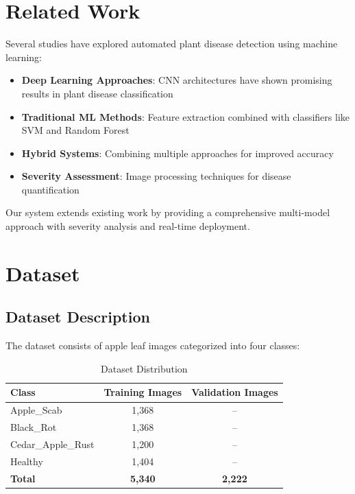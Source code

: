 \documentclass[11pt,a4paper]{article}
\begin{document}
\section{Related Work}
Several studies have explored automated plant disease detection using machine learning:
\begin{itemize}
    \item \textbf{Deep Learning Approaches}: CNN architectures have shown promising results in plant disease classification
    \item \textbf{Traditional ML Methods}: Feature extraction combined with classifiers like SVM and Random Forest
    \item \textbf{Hybrid Systems}: Combining multiple approaches for improved accuracy
    \item \textbf{Severity Assessment}: Image processing techniques for disease quantification
\end{itemize}

Our system extends existing work by providing a comprehensive multi-model approach with severity analysis and real-time deployment.

\section{Dataset}
\subsection{Dataset Description}
The dataset consists of apple leaf images categorized into four classes:
\begin{table}[h]
\centering
\caption{Dataset Distribution}
\begin{tabular}{lcc}
\toprule
\textbf{Class} & \textbf{Training Images} & \textbf{Validation Images} \\
\midrule
Apple\_Scab & 1,368 & -- \\
Black\_Rot & 1,368 & -- \\
Cedar\_Apple\_Rust & 1,200 & -- \\
Healthy & 1,404 & -- \\
\midrule
\textbf{Total} & \textbf{5,340} & \textbf{2,222} \\
\bottomrule
\end{tabular}
\end{table}
\end{document}
